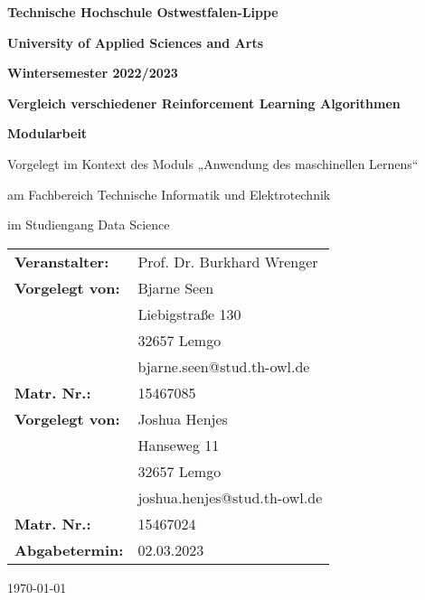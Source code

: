 \documentclass[../documentation.tex]{subfiles}
\begin{document}
\begin{titlepage}
    \begin{center}   
    {\textbf{Technische Hochschule Ostwestfalen-Lippe}}\\
    {\textbf{University of Applied Sciences and Arts}\par}\vspace{1.5cm}
    {\Large\bfseries Wintersemester 2022/2023\par}\vspace{1.5cm}
    {\huge\bfseries Vergleich verschiedener Reinforcement Learning Algorithmen \par}
    \vspace{1.5cm}
    {\Large\bfseries Modularbeit}\\
    {\large Vorgelegt im Kontext des Moduls „Anwendung des maschinellen Lernens“\par} \vspace{1cm}
    {\large am Fachbereich Technische Informatik und Elektrotechnik}\\
    {\large im Studiengang Data Science\par} \vspace{2cm}
    \end{center}
    \vfill
    \begin{tabular}{l l}
    \textbf{Veranstalter:}& {Prof. Dr. Burkhard Wrenger}\\ 
    \textbf{Vorgelegt von:}& {Bjarne Seen}\\ 
    \textbf{} & {Liebigstraße 130} \\
    \textbf{} & {32657 Lemgo} \\
    \textbf{} & {bjarne.seen@stud.th-owl.de} \\
    \textbf{Matr. Nr.:} & {15467085} \\
    \textbf{Vorgelegt von:}& {Joshua Henjes}\\ 
    \textbf{} & {Hanseweg 11} \\
    \textbf{} & {32657 Lemgo} \\
    \textbf{} & {joshua.henjes@stud.th-owl.de} \\
    \textbf{Matr. Nr.:} & {15467024} \\
    \textbf{Abgabetermin:} & {02.03.2023} 
    \end{tabular}   
    \begin{center}
    \vfill

    {\large\today\par}
    \end{center}
\end{titlepage}
\end{document}
